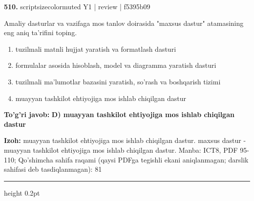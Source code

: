 \documentclass[10pt,a4paper]{article}
\begin{document}
{\bfseries\sffamily\color{ink} 510.} {scriptsizecolor{muted} Y1 | review | f5395b09}
\par
Amaliy dasturlar va vazifaga mos tanlov doirasida "maxsus dastur" atamasining eng aniq ta'rifini toping.
\begin{enumerate}[label=\Alph*),leftmargin=9mm]
\item tuzilmali matnli hujjat yaratish va formatlash dasturi
\item formulalar asosida hisoblash, model va diagramma yaratish dasturi
\item tuzilmali ma'lumotlar bazasini yaratish, so'rash va boshqarish tizimi
\item muayyan tashkilot ehtiyojiga mos ishlab chiqilgan dastur
\end{enumerate}
\begin{tcolorbox}[enhanced,breakable,colback=teal!4,colframe=teal!60!black,boxrule=0.45pt,arc=1.2mm,left=2.7mm,right=2.7mm,top=1.8mm,bottom=1.8mm,before skip=2mm,after skip=2mm]
{\bfseries\sffamily\color{teal}To'g'ri javob:} \textbf{D) muayyan tashkilot ehtiyojiga mos ishlab chiqilgan dastur}
\par\smallskip
{\bfseries Izoh:} muayyan tashkilot ehtiyojiga mos ishlab chiqilgan dastur. maxsus dastur - muayyan tashkilot ehtiyojiga mos ishlab chiqilgan dastur. Manba: ICT8, PDF 95-110; Qo'shimcha sahifa raqami (qaysi PDFga tegishli ekani aniqlanmagan; darslik sahifasi deb tasdiqlanmagan): 81
\end{tcolorbox}
\vspace{2mm}\hrule height 0.2pt\vspace{3mm}
\end{document}
